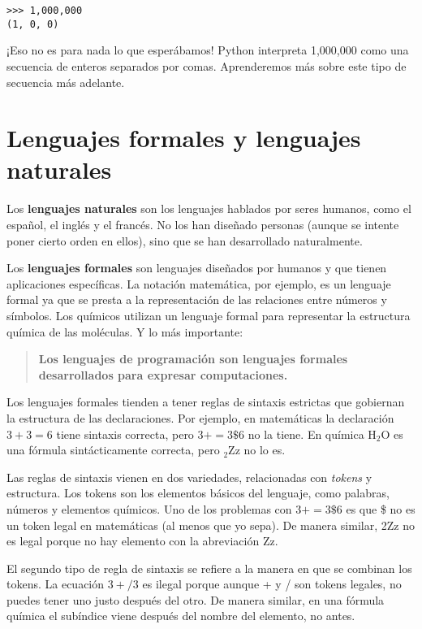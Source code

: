\begin{lstlisting}
>>> 1,000,000
(1, 0, 0)
\end{lstlisting}

¡Eso no es para nada lo que esperábamos! Python interpreta 1,000,000 como una secuencia de enteros separados por comas. Aprenderemos más sobre este tipo de secuencia más adelante.

\section{Lenguajes formales y lenguajes naturales}

Los \textbf{lenguajes naturales} son los lenguajes hablados por seres humanos, como el español, el inglés y el francés. No los han diseñado personas (aunque se intente poner cierto orden en ellos), sino que se han desarrollado naturalmente.

Los \textbf{lenguajes formales} son lenguajes diseñados por humanos y que tienen aplicaciones específicas. La notación matemática, por ejemplo, es un lenguaje formal ya que se presta a la representación de las relaciones entre números y símbolos. Los químicos utilizan un lenguaje formal para representar la estructura química de las moléculas. Y lo más importante:

\begin{quote}
\textbf{Los lenguajes de programación son lenguajes formales desarrollados para expresar computaciones.}
\end{quote}

Los lenguajes formales tienden a tener reglas de sintaxis estrictas que gobiernan la estructura de las declaraciones. Por ejemplo, en matemáticas la declaración $3 + 3 = 6$ tiene sintaxis correcta, pero $3+ = 3\$6$ no la tiene. En química H$_2$O es una fórmula sintácticamente correcta, pero $_2$Zz no lo es.

Las reglas de sintaxis vienen en dos variedades, relacionadas con \textit{tokens} y estructura. Los tokens son los elementos básicos del lenguaje, como palabras, números y elementos químicos. Uno de los problemas con $3+ = 3\$6$ es que \$ no es un token legal en matemáticas (al menos que yo sepa). De manera similar, 2Zz no es legal porque no hay elemento con la abreviación Zz.

El segundo tipo de regla de sintaxis se refiere a la manera en que se combinan los tokens. La ecuación $3 +/3$ es ilegal porque aunque + y / son tokens legales, no puedes tener uno justo después del otro. De manera similar, en una fórmula química el subíndice viene después del nombre del elemento, no antes.

